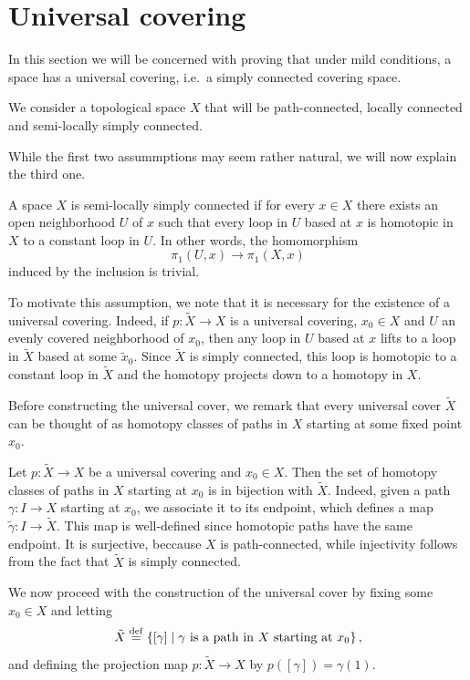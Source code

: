 \documentclass{report}
\begin{document}
\section{Universal covering}
In this section we will be concerned with proving that under mild conditions, a space has a universal covering, i.e.\ a simply connected covering space.
\begin{assumption}
We consider a topological space $X$ that will be path-connected, locally connected and semi-locally simply connected.
\end{assumption}
While the first two assummptions may seem rather natural, we will now explain the third one.
\begin{definition}
    A space $X$ is semi-locally simply connected if for every $x \in X$ there exists an open neighborhood $U$ of $x$ such that every loop in $U$ based at $x$ is homotopic in $X$ to a constant loop in $U$.
    In other words, the homomorphism
    \[
    \pi_1(U, x) \to \pi_1(X, x)
    \]
    induced by the inclusion is trivial.
\end{definition}
To motivate this assumption, we note that it is necessary for the existence of a universal covering.
Indeed, if $p: \tilde X \to X$ is a universal covering, $x_0 \in X$ and $U$ an evenly covered neighborhood of $x_0$, then any loop in $U$ based at $x$ lifts to a loop in $\tilde X$ based at some $\tilde x_0$.
Since $\tilde X$ is simply connected, this loop is homotopic to a constant loop in $\tilde X$ and the homotopy projects down to a homotopy in $X$.

Before constructing the universal cover, we remark that every universal cover $\tilde X$ can be thought of as homotopy classes of paths in $X$ starting at some fixed point $x_0$.
\begin{remark}
    Let $p: \tilde X \to X$ be a universal covering and $x_0 \in X$.
    Then the set of homotopy classes of paths in $X$ starting at $x_0$ is in bijection with $\tilde X$.
    Indeed, given a path $\gamma: I \to X$ starting at $x_0$, we associate it to its endpoint, which defines a map $\tilde \gamma: I \to \tilde X$.
    This map is well-defined since homotopic paths have the same endpoint.
    It is surjective, beccause $X$ is path-connected, while injectivity follows from the fact that $\tilde X$ is simply connected.
\end{remark}

We now proceed with the construction of the universal cover by fixing some $x_0 \in X$ and letting
\[
\tilde X \overset{\mathrm{def}}{=} \left\{ [\gamma] \mid \gamma \text{ is a path in } X \text{ starting at } x_0 \right\},
\]
and defining the projection map $p: \tilde X \to X$ by $p\left([\gamma]\right) = \gamma(1)$.
\end{document}
